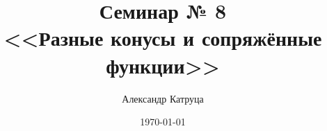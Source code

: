 \documentclass[12pt]{article}
\newtheorem{Def}{ Определение}
\begin{document}
\title{Семинар № 8 \\ 
<<Разные конусы и сопряжённые функции>>}
\author{Александр Катруца}
\date{\today}
\maketitle

\end{document}
